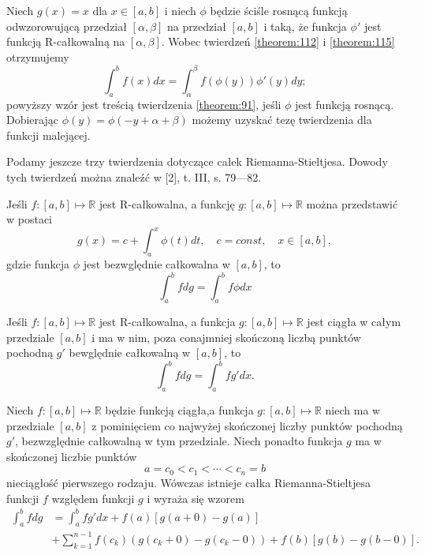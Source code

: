 \documentclass[leqno]{article}
\begin{document}
\begin{justify}
\begin{wniosek}
{
    Niech $g(x) = x$ dla $x \in [a,b]$ i niech $\phi$ będzie ściśle rosnącą funkcją odwzorowującą przedział
    $[\alpha, \beta]$ na przedział $[a,b]$ i taką, że funkcja $\phi'$ jest funkcją R-całkowalną na $[\alpha, \beta]$.
    Wobec twierdzeń \ref{theorem:112} i \ref{theorem:115} otrzymujemy 
    \[
        \int_{a}^{b}f(x)dx = \int_{\alpha}^{\beta}f(\phi(y))\phi'(y)dy;
    \]
    powyższy wzór jest treścią twierdzenia \ref{theorem:91}, jeśli $\phi$ jest funkcją rosnącą. Dobierając $\phi(y) = \phi(-y + \alpha + \beta)$
    możemy uzyskać tezę twierdzenia dla funkcji malejącej.
}
\end{wniosek}

Podamy jeszcze trzy twierdzenia dotyczące całek Riemanna-Stieltjesa. Dowody tych twierdzeń można znaleźć w [2], t. III, s. 79---82.

\begin{theorem}
{
    Jeśli $f : [a,b] \mapsto \mathbb{R}$ jest R-całkowalna, a funkcję $g : [a,b] \mapsto \mathbb{R}$ można przedstawić w postaci 
    \[
        g(x) = c + \int_{a}^{x}\phi(t)dt, \quad c=const, \quad x \in [a,b],
    \]
    gdzie funkcja $\phi$ jest bezwględnie całkowalna w $[a,b]$, to 
    \[
        \int_{a}^{b}fdg = \int_{a}^{b}f\phi dx
    \]
}
\end{theorem}

\begin{theorem}
{
    Jeśli $f : [a,b] \mapsto \mathbb{R}$ jest R-całkowalna, a funkcja $g : [a,b] \mapsto \mathbb{R}$ jest ciągła w całym przedziale
    $[a,b]$ i ma w nim, poza conajmniej skończoną liczbą punktów pochodną $g'$ bewględnie całkowalną w $[a,b]$, to
    \[
        \int_{a}^{b}fdg = \int_{a}^{b}fg'dx.
    \]
}
\end{theorem}

\begin{theorem}
{
    Niech $f : [a,b] \mapsto \mathbb{R}$ będzie funkcją ciągła,a funkcja $g : [a,b] \mapsto \mathbb{R}$
    niech ma w przedziale $[a,b]$ z pominięciem co najwyżej skończonej liczby punktów pochodną $g'$, bezwzględnie całkowalną w tym przedziale.
    Niech ponadto funkcja $g$ ma w skończonej liczbie punktów
    \[
        a = c_0 < c_1 < \cdots < c_n = b
    \]
    nieciągłość pierwszego rodzaju. Wówczas istnieje całka Riemanna-Stieltjesa funkcji $f$ względem funkcji $g$ i wyraża się wzorem
    \begin{align*}
        \int_{a}^{b}fdg &= \int_{a}^{b}fg'dx + f(a)[g(a + 0) -g(a)] \\
                        &+ \sum_{k=1}^{n-1}f(c_k)(g(c_k + 0) - g(c_k - 0)) + f(b)[g(b) - g(b - 0)].
    \end{align*}
}
\end{theorem}


\end{justify}
\end{document}
